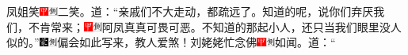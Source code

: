 凤姐笑{\includegraphics[width=3mm]{../Images/00002}\includegraphics[width=3mm]{../Images/00011}\footnotesize \kaishu 二笑。}道：``亲戚们不大走动，都疏远了。知道的呢，说你们弃厌我们，不肯常来；{\includegraphics[width=3mm]{../Images/00002}\includegraphics[width=3mm]{../Images/00011}\footnotesize \kaishu 阿凤真真可畏可恶。}不知道的那起小人，还只当我们眼里没人似的。''{\includegraphics[width=3mm]{../Images/00006}\includegraphics[width=3mm]{../Images/00011}\footnotesize \kaishu 偏会如此写来，教人爱煞！}刘姥姥忙念佛{\includegraphics[width=3mm]{../Images/00002}\includegraphics[width=3mm]{../Images/00011}\footnotesize \kaishu 如闻。}道：``
